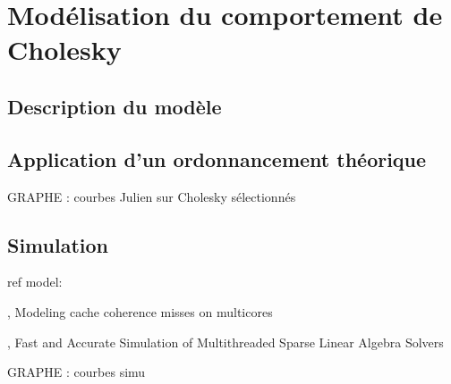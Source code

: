 \section{Modélisation du comportement de Cholesky}
\subsection{Description du modèle}
\subsection{Application d'un ordonnancement théorique}

\begin{todo}
GRAPHE : courbes Julien sur Cholesky sélectionnés
\end{todo}

\subsection{Simulation}

ref model:

\cite{Pan2014}, Modeling cache coherence misses on multicores

\cite{Stanisic2016}, Fast and Accurate Simulation of Multithreaded Sparse Linear Algebra Solvers




\begin{todo}
GRAPHE : courbes simu
\end{todo}
